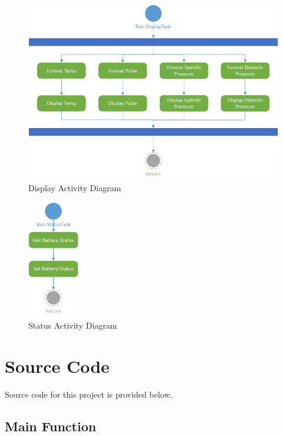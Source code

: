 \documentclass[12pt]{article} %
\begin{document}
    \begin{figure}
      \centering
      \includegraphics[width=\textwidth]{../design/display_activity.png}
      \caption{Display Activity Diagram}
      \label{fig:displayActivity}
    \end{figure}

    \begin{figure}
      \centering
      \includegraphics[width=0.2\textwidth]{../design/Status_activity.png}
      \caption{Status Activity Diagram}
      \label{fig:statusActivity}
    \end{figure}

    \pagebreak

    \section{Source Code}

    Source code for this project is provided below.

    \subsection{Main Function}
    
\end{document}
